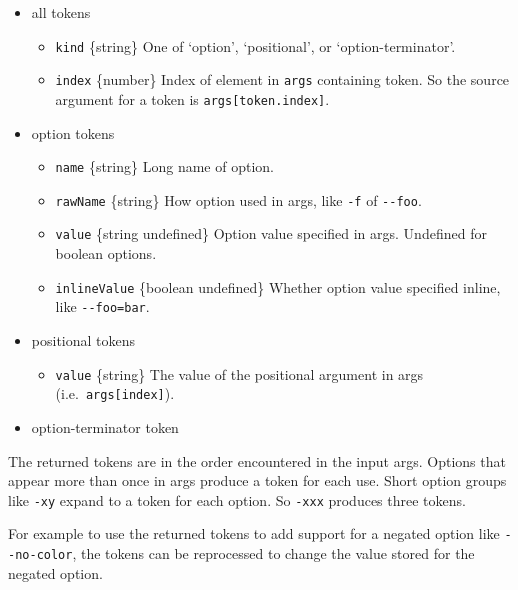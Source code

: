 \begin{itemize}
\tightlist
\item
  all tokens

  \begin{itemize}
  \tightlist
  \item
    \texttt{kind} \{string\} One of `option', `positional', or
    `option-terminator'.
  \item
    \texttt{index} \{number\} Index of element in \texttt{args}
    containing token. So the source argument for a token is
    \texttt{args{[}token.index{]}}.
  \end{itemize}
\item
  option tokens

  \begin{itemize}
  \tightlist
  \item
    \texttt{name} \{string\} Long name of option.
  \item
    \texttt{rawName} \{string\} How option used in args, like
    \texttt{-f} of \texttt{-\/-foo}.
  \item
    \texttt{value} \{string \textbar{} undefined\} Option value
    specified in args. Undefined for boolean options.
  \item
    \texttt{inlineValue} \{boolean \textbar{} undefined\} Whether option
    value specified inline, like \texttt{-\/-foo=bar}.
  \end{itemize}
\item
  positional tokens

  \begin{itemize}
  \tightlist
  \item
    \texttt{value} \{string\} The value of the positional argument in
    args (i.e.~\texttt{args{[}index{]}}).
  \end{itemize}
\item
  option-terminator token
\end{itemize}

The returned tokens are in the order encountered in the input args.
Options that appear more than once in args produce a token for each use.
Short option groups like \texttt{-xy} expand to a token for each option.
So \texttt{-xxx} produces three tokens.

For example to use the returned tokens to add support for a negated
option like \texttt{-\/-no-color}, the tokens can be reprocessed to
change the value stored for the negated option.

